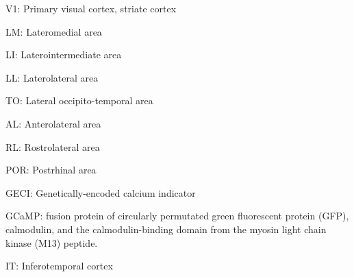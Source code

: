 
\noindent V1: Primary visual cortex, striate cortex

\vspace{0.1in}
\noindent LM: Lateromedial area

\vspace{0.1in}
\noindent LI: Laterointermediate area

\vspace{0.1in}
\noindent LL: Laterolateral area

\vspace{0.1in}
\noindent TO: Lateral occipito-temporal area

\vspace{0.1in}
\noindent AL: Anterolateral area

\vspace{0.1in}
\noindent RL: Rostrolateral area

\vspace{0.1in}
\noindent POR: Postrhinal area

\vspace{0.1in}
\noindent GECI: Genetically-encoded calcium indicator

\vspace{0.1in}
\noindent GCaMP: fusion protein of circularly permutated green fluorescent protein (GFP), calmodulin, and the calmodulin-binding domain from the myosin light chain kinase (M13) peptide.

\vspace{0.1in}
\noindent IT: Inferotemporal cortex
